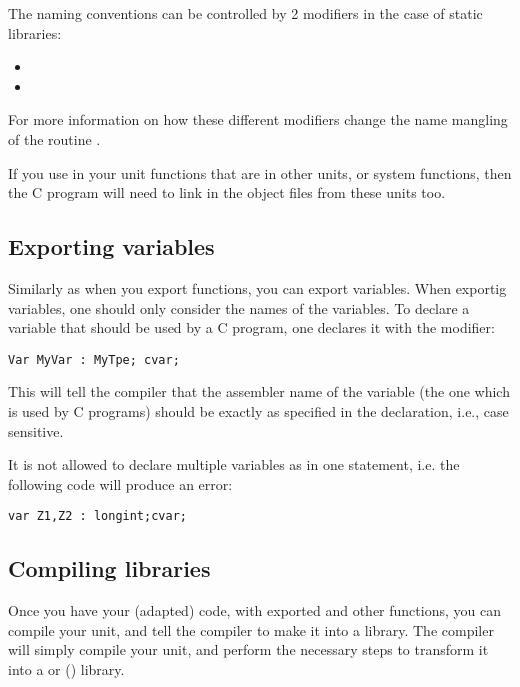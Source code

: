 The naming conventions can be controlled by 2 modifiers in the case
of static libraries:
\begin{itemize}
\item {}
\item {}
\end{itemize}

For more information on how these different modifiers change the name
mangling of the routine .


\begin{remark}If you use in your unit functions that are in other units, or
system functions, then the C program will need to link in the object files
from these units too.
\end{remark}

\subsection{Exporting variables}
Similarly as when you export functions, you can export variables.
When exportig variables, one should only consider the names of the
variables. To declare a variable that should be used by a C program,
one declares it with the  modifier:
\begin{verbatim}
Var MyVar : MyTpe; cvar;
\end{verbatim}
This will tell the compiler that the assembler name of the variable (the one
which is used by C programs) should be exactly as specified in the
declaration, i.e., case sensitive.

It is not allowed to declare multiple variables as  in one
statement, i.e. the following code will produce an error:
\begin{verbatim}
var Z1,Z2 : longint;cvar;
\end{verbatim}

\subsection {Compiling libraries}

Once you have your (adapted) code, with exported and other functions,
you can compile your unit, and tell the compiler to make it into a library.
The compiler will simply compile your unit, and perform the necessary steps
to transform it into a  or  () library.

